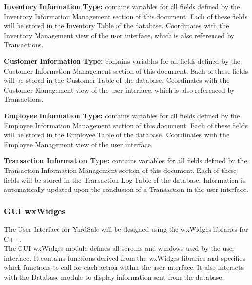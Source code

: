 \documentclass{report}
\begin{document}
                \begin{list}{}
                    \item{{\bf Inventory Information Type:} contains variables for all
                    fields defined by the Inventory Information Management section
                    of this document.  Each of these fields will be stored in the
                    Inventory Table of the database.  Coordinates with the Inventory Management
                    view of the user interface, which is also referenced by Transactions.}

                    \item{{\bf Customer Information Type:} contains variables for all
                    fields defined by the Customer Information Management section
                    of this document.  Each of these fields will be stored in the
                    Customer Table of the database.  Coordinates with the Customer Management
                    view of the user interface, which is also referenced by Transactions.}

                    \item{{\bf Employee Information Type:} contains variables for all
                    fields defined by the Employee Information Management section
                    of this document.  Each of these fields will be stored in the
                    Employee Table of the database.  Coordinates with the Employee Management
                    view of the user interface.}

                    \item{{\bf Transaction Information Type:} contains variables for all
                    fields defined by the Transaction Information Management section
                    of this document.  Each of these fields will be stored in the
                    Transaction Log Table of the database.
                    Information is automatically updated upon the
                    conclusion of a Transaction in the user
                    interface.}
                \end{list}{}

            \subsubsection{GUI wxWidges}
                The User Interface for YardSale will be designed
                using the wxWidges libraries for C++.\\
                The GUI wxWidges module defines all screens and windows used by the
                user interface.  It contains functions derived from the
                wxWidges libraries and specifies which functions to call
                for each action within the user interface.  It also interacts with the
                Database module to display information sent from the
                database.\\
\end{document}
